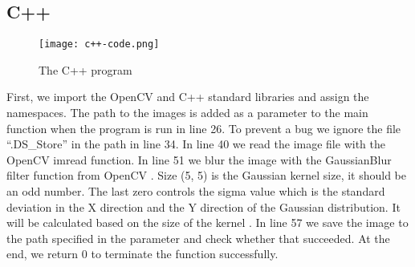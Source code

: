 \subsection{C++}
\begin{figure}[htbp]
	\centering
	\texttt{[image: c++-code.png]}
	\caption{The C++ program}
	\label{figure:C++-code}
\end{figure}
First, we import the OpenCV and C++ standard libraries and assign the namespaces. The path to the images is added as a parameter to the main function when the program is run in line 26. To prevent a bug we ignore the file “.DS\_Store” in the path in line 34. In line 40 we read the image file with the OpenCV imread function. In line 51 we blur the image with the GaussianBlur filter function from OpenCV \cite{gaussianblur}. Size (5, 5) is the Gaussian kernel size, it should be an odd number. The last zero controls the sigma value which is the standard deviation in the X direction and the Y direction of the Gaussian distribution. It will be calculated based on the size of the kernel \cite{gaussianblurtutorial}. In line 57 we save the image to the path specified in the parameter and check whether that succeeded. At the end, we return 0 to terminate the function successfully.
